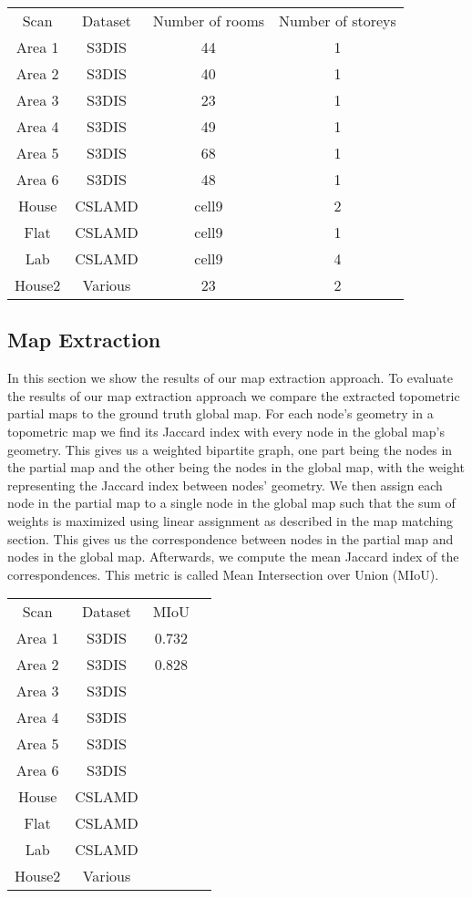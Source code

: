\begin{tabular}{ c c c c }
    Scan & Dataset & Number of rooms & Number of storeys \\ 
    Area 1 & S3DIS & 44 & 1 \\  
    Area 2 & S3DIS & 40 & 1 \\
    Area 3 & S3DIS & 23 & 1 \\
    Area 4 & S3DIS & 49 & 1 \\
    Area 5 & S3DIS & 68 & 1 \\
    Area 6 & S3DIS & 48 & 1 \\

    House & CSLAMD & cell9 & 2 \\
    Flat & CSLAMD & cell9 & 1 \\
    Lab & CSLAMD & cell9 & 4 \\

    House2 & Various & 23 & 2 \\

\end{tabular}

\subsection{Map Extraction}
In this section we show the results of our map extraction approach. To evaluate the results of our map extraction approach we compare the extracted topometric partial maps to the ground truth global map. For each node's geometry in a topometric map we find its Jaccard index with every node in the global map's geometry. This gives us a weighted bipartite graph, one part being the nodes in the partial map and the other being the nodes in the global map, with the weight representing the Jaccard index between nodes' geometry. We then assign each node in the partial map to a single node in the global map such that the sum of weights is maximized using linear assignment as described in the map matching section. This gives us the correspondence between nodes in the partial map and nodes in the global map. Afterwards, we compute the mean Jaccard index of the correspondences. This metric is called Mean Intersection over Union (MIoU). 

\begin{tabular}{ c c c c }
    Scan & Dataset & MIoU \\ 
    Area 1 & S3DIS & 0.732 \\  
    Area 2 & S3DIS & 0.828 \\
    Area 3 & S3DIS &  \\
    Area 4 & S3DIS &  \\
    Area 5 & S3DIS &  \\
    Area 6 & S3DIS &  \\

    House & CSLAMD &  &  \\
    Flat & CSLAMD &  &  \\
    Lab & CSLAMD &  &  \\

    House2 & Various &  &  \\

\end{tabular}

